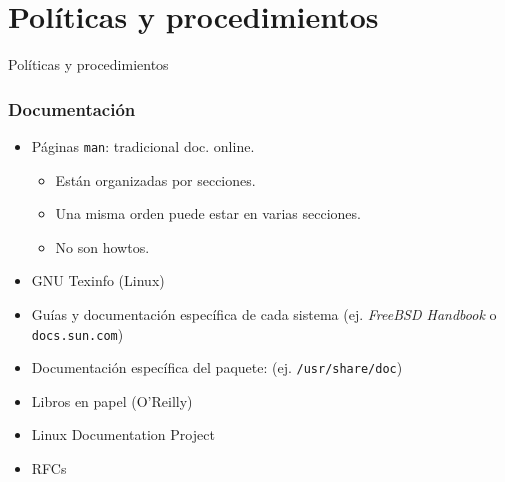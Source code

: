 \documentclass{beamer}
\begin{document}




\section{Políticas y procedimientos}


\begin{frame}

\begin{center}
\huge{Políticas y procedimientos}
\end{center}

\end{frame}


\begin{frame}
\frametitle{Documentación}

\begin{itemize}
\item Páginas \texttt{man}: tradicional doc. online.
	\begin{itemize}
	\item Están organizadas por secciones. 
	\item Una misma orden puede estar en varias secciones.
	\item No son howtos. 
	\end{itemize}
\item GNU Texinfo (Linux)
\item Guías y documentación específica de cada sistema (ej. \textit{FreeBSD Handbook} o \texttt{docs.sun.com})
\item Documentación específica del paquete: (ej. \texttt{/usr/share/doc})
\item Libros en papel (O'Reilly)
\item Linux Documentation Project
\item RFCs
\end{itemize}

\end{frame}
\end{document}
